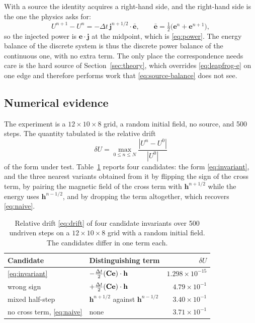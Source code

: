 With a source the identity acquires a right-hand side, and the right-hand side is the one the physics asks for:
\begin{equation}
  U^{n+1}-U^{n} = -\Delta t\,\mathbf{j}^{n+1/2}\cdot\bar{\mathbf{e}},
  \qquad \bar{\mathbf{e}} = \tfrac12\bigl(\mathbf{e}^{n}+\mathbf{e}^{n+1}\bigr),
  \label{eq:source-balance}
\end{equation}
so the injected power is $\mathbf{e}\cdot\mathbf{j}$ at the midpoint, which is \eqref{eq:power}. The energy
balance of the discrete system is thus the discrete power balance of the continuous one, with no extra term. The
only place the correspondence needs care is the hard source of Section~\ref{sec:theory}, which overrides
\eqref{eq:leapfrog-e} on one edge and therefore performs work that \eqref{eq:source-balance} does not see.

\subsection{Numerical evidence}
\label{sec:evidence}

The experiment is a $12\times10\times8$ grid, a random initial field, no source, and 500 steps. The quantity
tabulated is the relative drift
\begin{equation}
  \delta U = \max_{0\le n\le N}\frac{|U^{n}-U^{0}|}{|U^{0}|}
  \label{eq:drift}
\end{equation}
of the form under test. Table~\ref{tab:candidates} reports four candidates: the form \eqref{eq:invariant}, and the
three nearest variants obtained from it by flipping the sign of the cross term, by pairing the magnetic field of
the cross term with $\mathbf{h}^{n+1/2}$ while the energy uses $\mathbf{h}^{n-1/2}$, and by dropping the term
altogether, which recovers \eqref{eq:naive}.

\begin{table}[H]
  \centering
  \caption{Relative drift \eqref{eq:drift} of four candidate invariants over 500 undriven steps on a
  $12\times10\times8$ grid with a random initial field. The candidates differ in one term each.}
  \label{tab:candidates}
  \begin{tabular}{@{}llr@{}}
    \toprule
    Candidate & Distinguishing term & $\delta U$ \\
    \midrule
    \eqref{eq:invariant}   & $-\tfrac{\Delta t}{2}(\mathbf{C}\mathbf{e})\cdot\mathbf{h}$ & $1.298\times10^{-15}$ \\
    wrong sign             & $+\tfrac{\Delta t}{2}(\mathbf{C}\mathbf{e})\cdot\mathbf{h}$ & $4.79\times10^{-1}$ \\
    mixed half-step        & $\mathbf{h}^{n+1/2}$ against $\mathbf{h}^{n-1/2}$      & $3.40\times10^{-1}$ \\
    no cross term, \eqref{eq:naive} & none                                          & $3.71\times10^{-1}$ \\
    \bottomrule
  \end{tabular}
\end{table}


